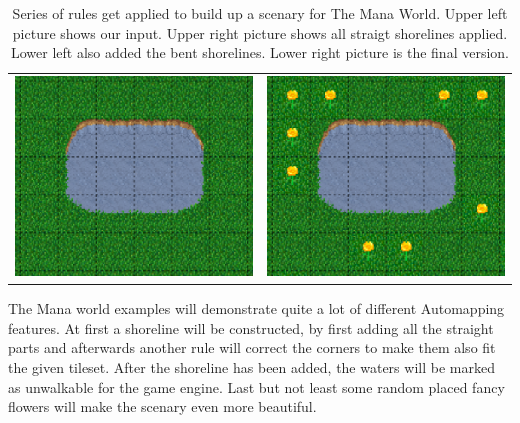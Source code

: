 \begin{table}
\begin{tabular}{c c}
        \includegraphics[scale=1]{Example/TheManaWorld/flow3.eps} &
        \includegraphics[scale=1]{Example/TheManaWorld/flow4.eps} \\
        \end{tabular}
  \caption{Series of rules get applied to build up a scenary for The Mana World. Upper left picture shows our input.
  Upper right picture shows all straigt shorelines applied. Lower left also added the bent shorelines. Lower right picture is the final version.}
\end{table}

The Mana world examples will demonstrate quite a lot of different Automapping
features. At first a shoreline will be constructed, by first adding all
the straight parts and afterwards another rule will correct the corners
to make them also fit the given tileset. After the shoreline has been added,
the waters will be marked as unwalkable for the game engine. Last but not least
some random placed fancy flowers will make the scenary even more beautiful.




